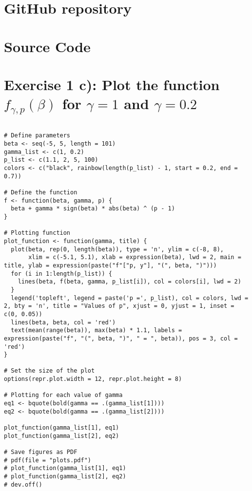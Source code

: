 \section{GitHub repository} 
\section{Source Code} \label{appendix:b}
\section*{Exercise 1 c): Plot the function $f_{\gamma, p}(\beta)$ for $\gamma = 1$ and $\gamma = 0.2$}
\begin{tcolorbox}[colback=white!95!black,colframe=white!50!black]
\begin{lstlisting}[caption={Exercise 1c}, label={lst:plot_func}]

# Define parameters
beta <- seq(-5, 5, length = 101)
gamma_list <- c(1, 0.2)
p_list <- c(1.1, 2, 5, 100)
colors <- c("black", rainbow(length(p_list) - 1, start = 0.2, end = 0.7))

# Define the function
f <- function(beta, gamma, p) {
  beta + gamma * sign(beta) * abs(beta) ^ (p - 1)
}

# Plotting function
plot_function <- function(gamma, title) {
  plot(beta, rep(0, length(beta)), type = 'n', ylim = c(-8, 8), 
       xlim = c(-5.1, 5.1), xlab = expression(beta), lwd = 2, main = title, ylab = expression(paste("f"["p, y"], "(", beta, ")")))
  for (i in 1:length(p_list)) {
    lines(beta, f(beta, gamma, p_list[i]), col = colors[i], lwd = 2)
  }
  legend('topleft', legend = paste('p =', p_list), col = colors, lwd = 2, bty = 'n', title = "Values of p", xjust = 0, yjust = 1, inset = c(0, 0.05))
  lines(beta, beta, col = 'red')
  text(mean(range(beta)), max(beta) * 1.1, labels = expression(paste("f", "(", beta, ")", " = ", beta)), pos = 3, col = 'red')
}

# Set the size of the plot
options(repr.plot.width = 12, repr.plot.height = 8)

# Plotting for each value of gamma
eq1 <- bquote(bold(gamma == .(gamma_list[1])))
eq2 <- bquote(bold(gamma == .(gamma_list[2])))

plot_function(gamma_list[1], eq1)
plot_function(gamma_list[2], eq2)

# Save figures as PDF
# pdf(file = "plots.pdf")
# plot_function(gamma_list[1], eq1)
# plot_function(gamma_list[2], eq2)
# dev.off()
\end{lstlisting}
\end{tcolorbox}
\vspace{50mm}
